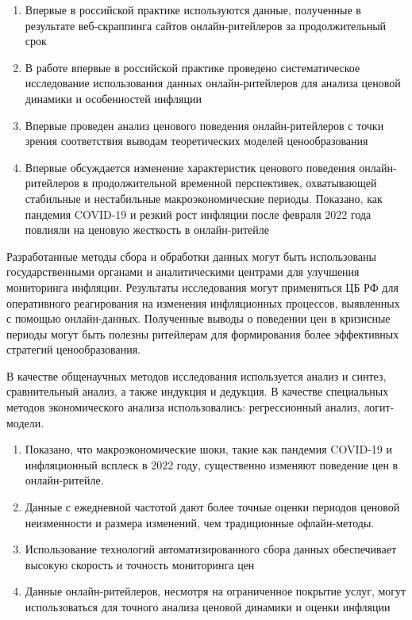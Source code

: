 {\novelty}
\begin{enumerate}[beginpenalty=10000] %
  \item Впервые в российской практике используются данные, полученные в результате веб-скраппинга сайтов онлайн-ритейлеров за продолжительный срок
  \item В работе впервые в российской практике проведено систематическое исследование использования данных онлайн-ритейлеров для анализа ценовой динамики и особенностей инфляции
  \item Впервые проведен анализ ценового поведения онлайн-ритейлеров с точки зрения соответствия выводам теоретических моделей ценообразования
  \item Впервые обсуждается изменение характеристик ценового поведения онлайн-ритейлеров в продолжительной временной перспективек, охватывающей стабильные и нестабильные макроэкономические периоды. Показано, как пандемия COVID-19 и резкий рост инфляции после февраля 2022 года повлияли на ценовую жесткость в онлайн-ритейле
\end{enumerate}

{\influence} Разработанные методы сбора и обработки данных могут быть использованы государственными органами и аналитическими центрами для улучшения мониторинга инфляции. Результаты исследования могут применяться ЦБ РФ для оперативного реагирования на изменения инфляционных процессов, выявленных с помощью онлайн-данных. Полученные выводы о поведении цен в кризисные периоды могут быть полезны ритейлерам для формирования более эффективных стратегий ценообразования.

{\methods} В качестве общенаучных методов исследования используется анализ и синтез, сравнительный анализ, а также индукция и дедукция. В качестве специальных методов экономического анализа использовались: регрессионный анализ, логит-модели.

{}
\begin{enumerate}[beginpenalty=10000] %
  \item Показано, что макроэкономические шоки, такие как пандемия COVID-19 и инфляционный всплеск в 2022 году, существенно изменяют поведение цен в онлайн-ритейле.
  \item Данные с ежедневной частотой дают более точные оценки периодов ценовой неизменности и размера изменений, чем традиционные офлайн-методы.
  \item Использование технологий автоматизированного сбора данных обеспечивает высокую скорость и точность мониторинга цен
  \item Данные онлайн-ритейлеров, несмотря на ограниченное покрытие услуг, могут использоваться для точного анализа ценовой динамики и оценки инфляции
\end{enumerate}

